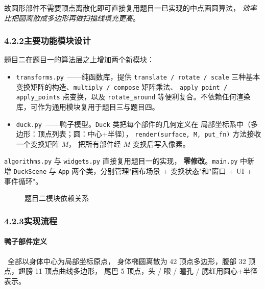 \documentclass[12pt, a4paper]{article}
\begin{document}
故圆形部件不需要顶点离散化即可直接复用题目一已实现的中点画圆算法，
\textit{效率比把圆离散成多边形再做扫描线填充更高}。

\subsubsection*{4.2.2\quad 主要功能模块设计}

题目二在题目一的算法层之上增加两个新模块：

\begin{itemize}[leftmargin=*]
    \item \texttt{transforms.py}\ ——纯函数库，提供 \texttt{translate / rotate / scale}
    三种基本变换矩阵的构造、\texttt{multiply / compose} 矩阵乘法、
    \texttt{apply\_point / apply\_points} 点变换，以及 \texttt{rotate\_around}
    等便利复合。不依赖任何渲染库，可作为通用模块复用于题目三与题目四。
    \item \texttt{duck.py}\ ——鸭子模型。\texttt{Duck} 类把每个部件的几何定义在
    局部坐标系中（多边形：顶点列表；圆：中心+半径），
    \texttt{render(surface, M, put\_fn)} 方法接收一个变换矩阵 $M$，
    把所有部件经 $M$ 变换后写入像素。
\end{itemize}

\texttt{algorithms.py} 与 \texttt{widgets.py} 直接复用题目一的实现，
\textbf{零修改}。\texttt{main.py} 中新增 \texttt{DuckScene} 与
\texttt{App} 两个类，分别管理"画布场景 + 变换状态"和"窗口 + UI + 事件循环"。

\begin{figure}[H]
\centering
{}
\caption{题目二模块依赖关系}
\label{fig:module-duck}
\end{figure}

\subsubsection*{4.2.3\quad 实现流程}

\paragraph{鸭子部件定义}\ 全部以身体中心为局部坐标原点，
身体椭圆离散为 42 顶点多边形，腹部 32 顶点，翅膀 11 顶点曲线多边形，
尾巴 5 顶点，头 / 眼 / 瞳孔 / 腮红用圆心+半径表示。
\end{document}

